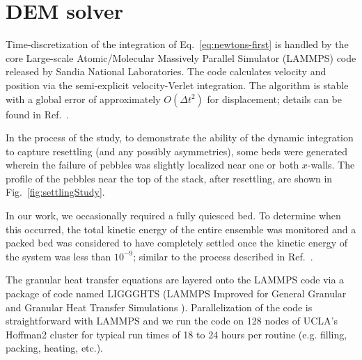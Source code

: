\section{DEM solver}\label{sec:dem-solver}

Time-discretization of the integration of Eq.~\ref{eq:newtons-first} is handled by the core Large-scale Atomic/Molecular Massively Parallel Simulator (LAMMPS) code released by Sandia National Laboratories\cite{Plimpton1995}. The code calculates velocity and position via the semi-explicit velocity-Verlet integration. The algorithm is stable with a global error of approximately $O(\Delta t^2)$ for displacement; details can be found in Ref.~\cite{Grubmuller1991}.

In the process of the study, to demonstrate the ability of the dynamic integration to capture resettling (and any possibly asymmetries), some beds were generated wherein the failure of pebbles was slightly localized near one or both $x$-walls. The profile of the pebbles near the top of the stack, after resettling, are shown in Fig.~\ref{fig:settlingStudy}. 

In our work, we occasionally required a fully quiesced bed. To determine when this occurred, the total kinetic energy of the entire ensemble was monitored and a packed bed was considered to have completely settled once the kinetic energy of the system was less than $10^{-9}$; similar to the process described in Ref.~\cite{Silbert2002}. 


The granular heat transfer equations are layered onto the LAMMPS code via a package of code named LIGGGHTS (LAMMPS Improved for General Granular and Granular Heat Transfer Simulations \cite{Kloss2012}). Parallelization of the code is straightforward with LAMMPS and we run the code on 128 nodes of UCLA's Hoffman2 cluster for typical run times of 18 to 24 hours per routine ({e.g.} filling, packing, heating, etc.).